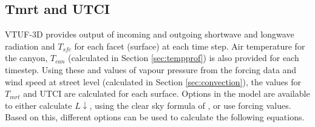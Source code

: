 \documentclass[final,3p,times,authoryear]{elsarticle}
\begin{document}


\subsection{Tmrt and UTCI}\label{sec:tmrtutci}

VTUF-3D provides output of incoming and outgoing shortwave and longwave radiation and $T_{sfc}$ for each facet (surface) at each time step. Air temperature for the canyon, $T_{can}$ (calculated in Section \ref{sec:tempprof}) is also provided for each timestep. Using these and values of vapour pressure from the forcing data and wind speed at street level (calculated in Section \ref{sec:convection}), the values for $T_{mrt}$ and UTCI are calculated for each surface. Options in the model are available to either calculate $L\downarrow$, using the clear sky formula of \cite{Prata1996}, or use forcing values. Based on this, different options can be used to calculate the following equations.
\end{document}

